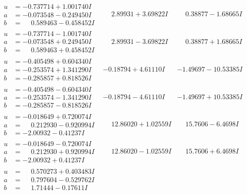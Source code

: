 \documentclass[1p]{elsarticle_modified}
\theoremstyle{definition}
\begin{document}
$$\begin{array}{c|c|c}
\begin{aligned}
u &= -0.737714 + 1.001740 I \\
a &= -0.073548 - 0.249450 I \\
b &= \phantom{-}0.589463 - 0.458452 I\end{aligned}
 & \phantom{-}2.89931 + 3.69822 I & \phantom{-}0.38877 - 1.68665 I \\ \hline\begin{aligned}
u &= -0.737714 - 1.001740 I \\
a &= -0.073548 + 0.249450 I \\
b &= \phantom{-}0.589463 + 0.458452 I\end{aligned}
 & \phantom{-}2.89931 - 3.69822 I & \phantom{-}0.38877 + 1.68665 I \\ \hline\begin{aligned}
u &= -0.405498 + 0.604340 I \\
a &= -0.253574 + 1.341290 I \\
b &= -0.285857 + 0.818526 I\end{aligned}
 & -0.18794 + 4.61110 I & -1.49697 - 10.53385 I \\ \hline\begin{aligned}
u &= -0.405498 - 0.604340 I \\
a &= -0.253574 - 1.341290 I \\
b &= -0.285857 - 0.818526 I\end{aligned}
 & -0.18794 - 4.61110 I & -1.49697 + 10.53385 I \\ \hline\begin{aligned}
u &= -0.018649 + 0.720074 I \\
a &= \phantom{-}0.212930 - 0.920994 I \\
b &= -2.00932 - 0.41237 I\end{aligned}
 & \phantom{-}12.86020 + 1.02559 I & \phantom{-}15.7606 - 6.4698 I \\ \hline\begin{aligned}
u &= -0.018649 - 0.720074 I \\
a &= \phantom{-}0.212930 + 0.920994 I \\
b &= -2.00932 + 0.41237 I\end{aligned}
 & \phantom{-}12.86020 - 1.02559 I & \phantom{-}15.7606 + 6.4698 I \\ \hline\begin{aligned}
u &= \phantom{-}0.570273 + 0.403483 I \\
a &= \phantom{-}0.797604 - 0.529762 I \\
b &= \phantom{-}1.71444 - 0.17611 I\end{aligned}

\end{array}$$
\end{document}
